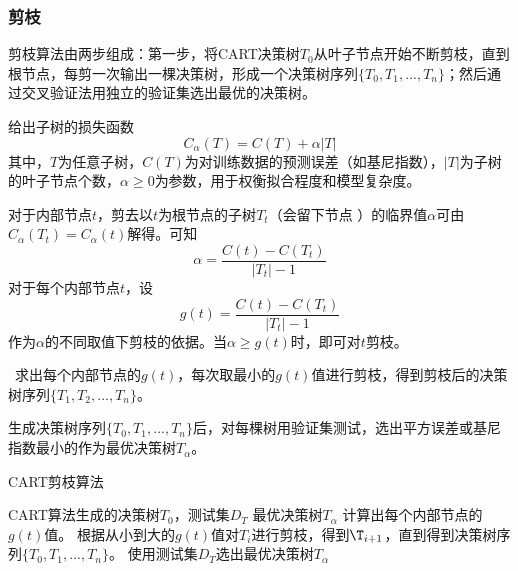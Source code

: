 \subsubsection{剪枝}
	剪枝算法由两步组成：第一步，将CART决策树$T_0$从叶子节点开始不断剪枝，直到根节点，每剪一次输出一棵决策树，形成一个决策树序列$\{ T_0,T_1,...,T_n\}$；然后通过交叉验证法用独立的验证集选出最优的决策树。\par
	给出子树的损失函数
\begin{equation}
	C_\alpha (T)=C(T)+\alpha |T|
\end{equation}
其中，$T$为任意子树，$C(T)$为对训练数据的预测误差（如基尼指数），$|T|$为子树的叶子节点个数，$\alpha \ge 0$为参数，用于权衡拟合程度和模型复杂度。\par
	对于内部节点$t$，剪去以$t$为根节点的子树$T_t$（会留下节点 ）的临界值$\alpha$可由$C_\alpha (T_t)=C_\alpha (t)$解得。可知
\begin{equation}
	\alpha=\frac{C(t)-C(T_t)}{|T_t|-1}
\end{equation}
	对于每个内部节点$t$，设
\begin{equation}
	g(t)=\frac{C(t)-C(T_t)}{|T_t|-1}
\end{equation}
作为$\alpha$的不同取值下剪枝的依据。当$\alpha \ge g(t)$时，即可对$t$剪枝。\par\
	求出每个内部节点的$g(t)$，每次取最小的$g(t)$值进行剪枝，得到剪枝后的决策树序列$\{ T_1,T_2,...,T_n\}$。\par
	生成决策树序列$\{ T_0,T_1,...,T_n\}$后，对每棵树用验证集测试，选出平方误差或基尼指数最小的作为最优决策树$T_\alpha$。\par
\begin{algorithm}
\caption{CART剪枝算法}
\begin{algorithmic}[1]
\Require CART算法生成的决策树$T_0$，测试集$D_T$
\Ensure 最优决策树$T_\alpha$
	\State 计算出每个内部节点的$g(t)$值。
	\State 根据从小到大的$g(t)$值对$T_i$进行剪枝，得到$\T_{i+1}$，直到得到决策树序列$\{T_0,T_1,...,T_n\}$。
	\State 使用测试集$D_T$选出最优决策树$T_\alpha$
\end{algorithmic}
\end{algorithm}
